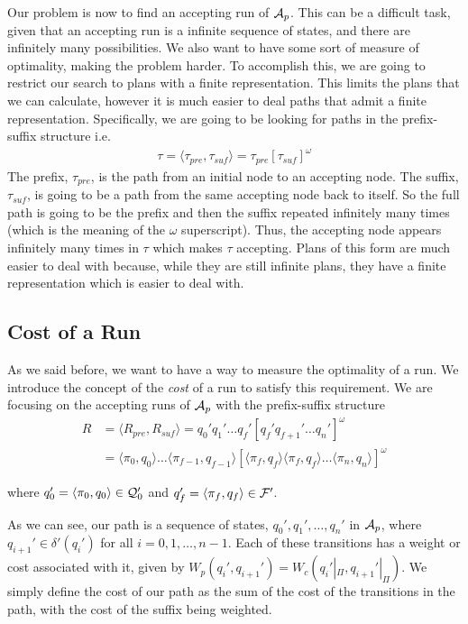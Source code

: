 Our problem is now to find an accepting run of $\mathcal{A}_p$. This can be a difficult task, given that an accepting run is a infinite sequence of states, and there are infinitely many possibilities. We also want to have some sort of measure of optimality, making the problem harder. To accomplish this, we are going to restrict our search to plans with a finite representation. This limits the plans that we can calculate, however it is much easier to deal paths that admit a finite representation. Specifically, we are going to be looking for paths in the prefix-suffix structure i.e.\
\begin{align*}
\tau = \langle \tau_{pre}, \tau_{suf} \rangle = \tau_{pre} [\tau_{suf}]^\omega
\end{align*}
The prefix, $\tau_{pre}$, is the path from an initial node to an accepting node. The suffix, $\tau_{suf}$, is going to be a path from the same accepting node back to itself. So the full path is going to be the prefix and then the suffix repeated infinitely many times (which is the meaning of the $\omega$ superscript). Thus, the accepting node appears infinitely many times in $\tau$ which makes $\tau$ accepting. Plans of this form are much easier to deal with because, while they are still infinite plans, they have a finite representation which is easier to deal with.

\subsection{Cost of a Run}
As we said before, we want to have a way to measure the optimality of a run. We introduce the concept of the \textit{cost} of a run to satisfy this requirement. We are focusing on the accepting runs of $\mathcal{A}_p$ with the prefix-suffix structure
\begin{align*}
R &= \langle R_{pre}, R_{suf} \rangle = q_0' q_1' \dots q_f' [q_f' q_{f+1}' \dots q_n']^\omega \\
&= \langle \pi_0, q_0 \rangle \dots \langle \pi_{f-1}, q_{f-1} \rangle [ \langle \pi_f , q_f \rangle \langle \pi_f , q_f \rangle \dots \langle \pi_{n}, q_n \rangle ]^\omega
\end{align*} 

where $q_0' = \langle \pi_0, q_0 \rangle \in \mathcal{Q}_0'$ and $q_f' = \langle \pi_f , q_f \rangle \in \mathcal{F}'$. 

As we can see, our path is a sequence of states, $q_0',q_1',\dots,q_n'$ in $\mathcal{A}_p$, where $q_{i+1}' \in \delta' (q_i')$ for all $i=0,1, \dots, n-1$. Each of these transitions has a weight or cost associated with it, given by $W_p(q_i',q_{i+1}') = W_c(q_i'|_\Pi , q_{i+1}'|_\Pi)$. We simply define the cost of our path as the sum of the cost of the transitions in the path, with the cost of the suffix being weighted.

